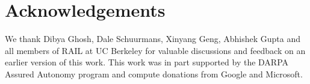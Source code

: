 \documentclass{article}
\begin{document}
\section*{Acknowledgements}
We thank Dibya Ghosh, Dale Schuurmans, Xinyang Geng, Abhishek Gupta and all members of RAIL at UC Berkeley for valuable discussions and feedback on an earlier version of this work. This work was in part supported by the DARPA Assured Autonomy program and compute donations from Google and Microsoft. 





\onecolumn
\appendix
\newpage

\end{document}
